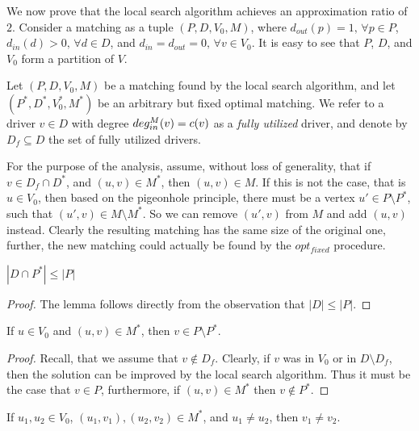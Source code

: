 We now prove that the local search algorithm achieves an approximation ratio of
$2$.
Consider a matching as a tuple $(P, D, V_0, M)$, 
where $d_{out}(p) = 1, \, \forall p \in P$,
$d_{in}(d) > 0, \, \forall d \in D$,
and $d_{in} = d_{out} = 0, \, \forall v \in V_0$.
It is easy to see that $P$, $D$, and $V_0$ form a partition of $V$.

Let $(P, D, V_0, M)$ be a matching found by the local search algorithm, and let
$(P^*, D^*, V^*_0, M^*)$ be an arbitrary but fixed optimal matching.
We refer to a driver $v \in D$ with degree $deg^M_{in}(v) = c(v)$ as a \emph{fully utilized}
driver, and denote by $D_f \subseteq D$ the set of fully utilized drivers.

For the purpose of the analysis, assume, without loss of generality, that
if $v \in D_f \cap D^*$, and $(u, v) \in M^*$, then $(u, v) \in M$.
If this is not the case, that is $u \in V_0$, then based on the pigeonhole principle,
there must be a vertex $u' \in P \setminus P^*$, such that $(u', v) \in M \setminus M^*$.
So we can remove $(u', v)$ from $M$ and add $(u, v)$ instead.
Clearly the resulting matching has the same size of the original one,
further, the new matching could actually be found by the $opt_{fixed}$ procedure.


\begin{lemma}
\label{lm:dleqp}
$|D \cap P^*| \leq |P|$
\end{lemma}

\begin{proof}
The lemma follows directly from the observation that 
${|D| \leq |P|}$.
\end{proof}

\begin{lemma}
\label{lm:v_in_p}
If $u \in V_0$ and $(u, v) \in M^*$, then $v \in P \setminus P^*$.
\end{lemma}

\begin{proof}
Recall, that we assume that $v \notin D_f$.
Clearly, if $v$ was in $V_0$ or in $D \setminus D_f$, 
then the solution can be improved by the local search algorithm.
Thus it must be the case that $v \in P$, furthermore, 
if $(u, v) \in M^*$ then $v \notin P^*$. 
\end{proof}

\begin{lemma}
\label{lm:u1nequ2thenv1neqv2}
If $u_1, u_2 \in V_0$, 
$(u_1, v_1), (u_2, v_2) \in M^*$, 
and $u_1 \neq u_2$,
then $v_1 \neq v_2$.
\end{lemma}


